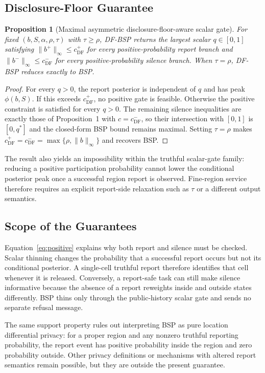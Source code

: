 \documentclass[10pt,journal,compsoc]{IEEEtran}
\newtheorem{proposition}{Proposition}
\begin{document}
\subsection{Disclosure-Floor Guarantee}
\begin{proposition}[Maximal asymmetric disclosure-floor-aware scalar gate]
For fixed $(b,S,\alpha,\rho,\tau)$ with $\tau\ge\rho$, DF-BSP returns the largest scalar $q\in[0,1]$ satisfying $\|b^+\|_\infty\le c^+_{\mathrm{DF}}$ for every positive-probability report branch and $\|b^-\|_\infty\le c^-_{\mathrm{DF}}$ for every positive-probability silence branch. When $\tau=\rho$, DF-BSP reduces exactly to BSP.
\end{proposition}
\begin{proof}
For every $q>0$, the report posterior is independent of $q$ and has peak $\phi(b,S)$. If this exceeds $c^+_{\mathrm{DF}}$, no positive gate is feasible. Otherwise the positive constraint is satisfied for every $q>0$. The remaining silence inequalities are exactly those of Proposition~1 with $c=c^-_{\mathrm{DF}}$, so their intersection with $[0,1]$ is $[0,q^*]$ and the closed-form BSP bound remains maximal. Setting $\tau=\rho$ makes $c^+_{\mathrm{DF}}=c^-_{\mathrm{DF}}=\max\{\rho,\|b\|_\infty\}$ and recovers BSP.
\end{proof}

The result also yields an impossibility within the truthful scalar-gate family: reducing a positive participation probability cannot lower the conditional posterior peak once a successful region report is observed. Fine-region service therefore requires an explicit report-side relaxation such as $\tau$ or a different output semantics.

\subsection{Scope of the Guarantees}
Equation~\eqref{eq:positive} explains why both report and silence must be checked. Scalar thinning changes the probability that a successful report occurs but not its conditional posterior. A single-cell truthful report therefore identifies that cell whenever it is released. Conversely, a report-safe task can still make silence informative because the absence of a report reweights inside and outside states differently. BSP thins only through the public-history scalar gate and sends no separate refusal message.

The same support property rules out interpreting BSP as pure location differential privacy: for a proper region and any nonzero truthful reporting probability, the report event has positive probability inside the region and zero probability outside. Other privacy definitions or mechanisms with altered report semantics remain possible, but they are outside the present guarantee.
\end{document}
